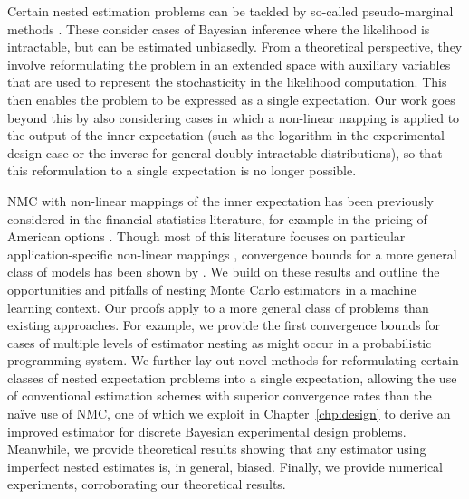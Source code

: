 Certain nested estimation problems can be tackled by so-called pseudo-marginal methods
\citep{beaumont2003estimation,andrieu2009pseudo,andrieu2010particle,
	andrieu2015convergence,naessethLS2015nested}.
These consider cases of Bayesian inference where the likelihood is intractable, 
but can be estimated unbiasedly.
From a theoretical perspective, they involve reformulating the problem in an extended space with auxiliary variables that
are used to represent the stochasticity in the likelihood computation. This then enables the
problem to be expressed as a single expectation.
Our work goes beyond this by also considering cases in which a non-linear mapping is
applied to the output of the inner expectation (such as the logarithm in the 
experimental design case or the inverse for general doubly-intractable distributions), so that 
this reformulation to a single expectation is no longer possible.

NMC with non-linear mappings of the inner expectation has been previously considered in
the financial statistics literature, for example in the pricing of American
options \citep{longstaff2001valuing}. Though most of this literature focuses on
particular application-specific non-linear mappings \citep{broadie2011efficient,gordy2010nested},
convergence bounds for a more general class of models
has been shown by \citet{hong2009estimating}.
We build on these results and outline the opportunities and pitfalls of nesting Monte Carlo
estimators in a machine learning context.
Our proofs apply to a more general class of problems than existing approaches.
For example, we provide the first convergence bounds for cases of multiple levels of estimator nesting
as might occur in a probabilistic programming system.
We further lay out novel methods for reformulating certain classes of nested expectation problems
into a single expectation, allowing the use of conventional \mc estimation 
schemes with superior convergence rates than the na\"{i}ve use of NMC, one of which we
exploit in Chapter~\ref{chp:design} to derive an improved estimator for discrete
Bayesian experimental design problems.
Meanwhile, we provide theoretical results showing that any \mc
estimator using imperfect nested estimates is, in general, biased.  Finally, we provide numerical
experiments, corroborating our theoretical results.




